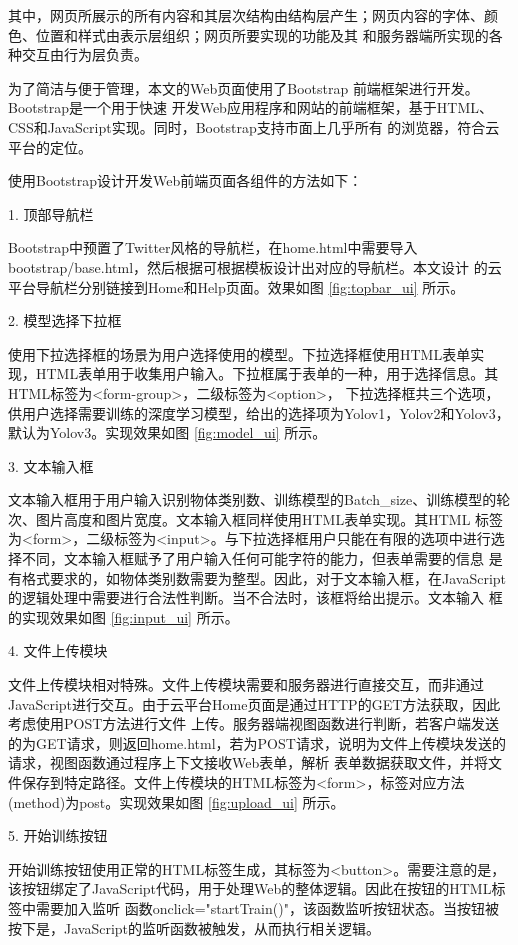 其中，网页所展示的所有内容和其层次结构由结构层产生；网页内容的字体、颜色、位置和样式由表示层组织；网页所要实现的功能及其
和服务器端所实现的各种交互由行为层负责。

为了简洁与便于管理，本文的Web页面使用了Bootstrap \cite{bootstrap}前端框架进行开发。Bootstrap是一个用于快速
开发Web应用程序和网站的前端框架，基于HTML、CSS和JavaScript实现。同时，Bootstrap支持市面上几乎所有
的浏览器，符合云平台的定位。

使用Bootstrap设计开发Web前端页面各组件的方法如下：

1. 顶部导航栏

Bootstrap中预置了Twitter风格的导航栏，在home.html中需要导入bootstrap/base.html，然后根据可根据模板设计出对应的导航栏。本文设计
的云平台导航栏分别链接到Home和Help页面。效果如图 \ref{fig:topbar_ui} 所示。

2. 模型选择下拉框

使用下拉选择框的场景为用户选择使用的模型。下拉选择框使用HTML表单实现，HTML表单用于收集用户输入。下拉框属于表单的一种，用于选择信息。其HTML标签为<form-group>，二级标签为<option>，
下拉选择框共三个选项，供用户选择需要训练的深度学习模型，给出的选择项为Yolov1，Yolov2和Yolov3，默认为Yolov3。实现效果如图 \ref{fig:model_ui} 所示。

3. 文本输入框

文本输入框用于用户输入识别物体类别数、训练模型的Batch\_size、训练模型的轮次、图片高度和图片宽度。文本输入框同样使用HTML表单实现。其HTML
标签为<form>，二级标签为<input>。与下拉选择框用户只能在有限的选项中进行选择不同，文本输入框赋予了用户输入任何可能字符的能力，但表单需要的信息
是有格式要求的，如物体类别数需要为整型。因此，对于文本输入框，在JavaScript的逻辑处理中需要进行合法性判断。当不合法时，该框将给出提示。文本输入
框的实现效果如图 \ref{fig:input_ui} 所示。
 
4. 文件上传模块

文件上传模块相对特殊。文件上传模块需要和服务器进行直接交互，而非通过JavaScript进行交互。由于云平台Home页面是通过HTTP的GET方法获取，因此考虑使用POST方法进行文件
上传。服务器端视图函数进行判断，若客户端发送的为GET请求，则返回home.html，若为POST请求，说明为文件上传模块发送的请求，视图函数通过程序上下文接收Web表单，解析
表单数据获取文件，并将文件保存到特定路径。文件上传模块的HTML标签为<form>，标签对应方法(method)为post。实现效果如图 \ref{fig:upload_ui} 所示。

5. 开始训练按钮

开始训练按钮使用正常的HTML标签生成，其标签为<button>。需要注意的是，该按钮绑定了JavaScript代码，用于处理Web的整体逻辑。因此在按钮的HTML标签中需要加入监听
函数onclick="startTrain()"，该函数监听按钮状态。当按钮被按下是，JavaScript的监听函数被触发，从而执行相关逻辑。

